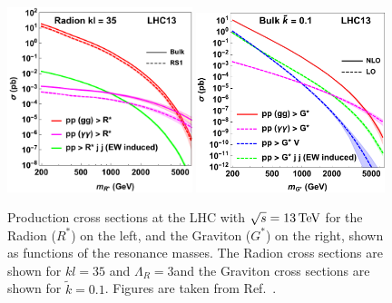 \begin{figure}
  \centering
  \includegraphics[width=0.48\textwidth]{Figures/Theory/WED/CX_RS_radion_13tev.pdf}
  \includegraphics[width=0.49\textwidth]{Figures/Theory/WED/CX_bulk_13tev.pdf}
  \caption[Graviton and Radion Production Cross Sections]{Production cross sections at the LHC with $\sqrt{s}=13\,\text{Te\hspace{-.08em}V}$ for the Radion ($R^*$) on the left, and the Graviton ($G^*$) on the right, shown as functions of the resonance masses. The Radion cross sections are shown for $kl=35$ and $\Lambda_R=3$\TeV and the Graviton cross sections are shown for $\tilde{k}=0.1$. Figures are taken from Ref.~\cite{Carvalho:2014lsg}.}\label{fig:WED_xs}
\end{figure}

